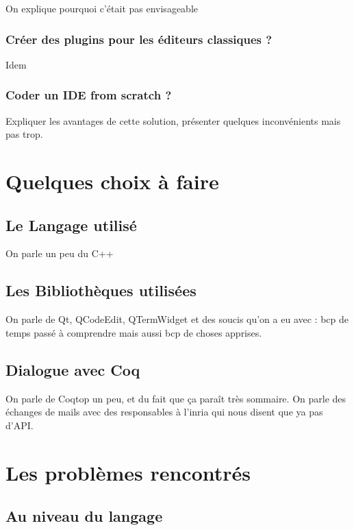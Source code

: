             On explique pourquoi c'était pas envisageable

        \subsubsection{Créer des plugins pour les éditeurs classiques ?}

            Idem
            
        \subsubsection{Coder un IDE from scratch ?}
        
            Expliquer les avantages de cette solution, présenter quelques inconvénients mais pas trop. 

\section{Quelques choix à faire}

    \subsection{Le Langage utilisé}
    
        On parle un peu du C++
        
    \subsection{Les Bibliothèques utilisées}
    
        On parle de Qt, QCodeEdit, QTermWidget et des soucis qu'on a eu avec : bcp de temps passé à comprendre mais aussi bcp de choses apprises.
        
    \subsection{Dialogue avec Coq}
    
        On parle de Coqtop un peu, et du fait que ça paraît très sommaire.
        On parle des échanges de mails avec des responsables à l'inria qui nous disent que ya pas d'API.
        
\section{Les problèmes rencontrés}

    \subsection{Au niveau du langage}
    

